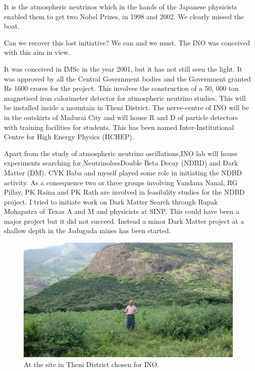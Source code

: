 It is the atmospheric neutrinos which in the hands of the Japanese 
physicists enabled them to get two Nobel Prizes, in 1998 and 2002. We 
clearly missed the boat.
\medskip

Can we recover this lost initiative? We can and we must. The INO was 
conceived with this aim in view.
\medskip

It was conceived in IMSc in the year 2001, but it has not still seen the 
light. It was approved by all the Central Government bodies and the 
Government granted Rs 1600 crores for the project. This involves the 
construction of a 50, 000 ton magnetised iron calorimeter detector for 
atmospheric neutrino studies. This will be installed inside a mountain 
in Theni District. The nerve-centre of INO will be in the outskirts of 
Madurai City and will house R and D of particle detectors with training 
facilities for students. This has been named Inter-Institutional Centre 
for High Energy Physics (IICHEP).
\medskip

Apart from the study of atmospheric neutrino oscillations,\break INO lab will 
house experiments searching for Neutrinoless\break Double Beta Decay (NDBD) 
and Dark Matter (DM). CVK Baba and myself played some role in initiating 
the NDBD activity. As a consequence two or three groups involving 
Vandana Nanal, RG Pillay, PK Raina and PK Rath are involved in 
feasibility studies for the NDBD project. I tried to initiate work on 
Dark Matter Search through Rupak Mohapatra of Texas A and M and 
physicists at SINP. This could have been a major project but it did not 
succeed. Instead a minor Dark Matter project at a shallow depth in the 
Jaduguda mines has been started.
\medskip

\begin{figure}[h]
\centering
\includegraphics[width=\textwidth]{images/Rajaji-ino.jpg}
\caption{At the site in Theni District chosen for INO.}  
\end{figure}
\smallskip

